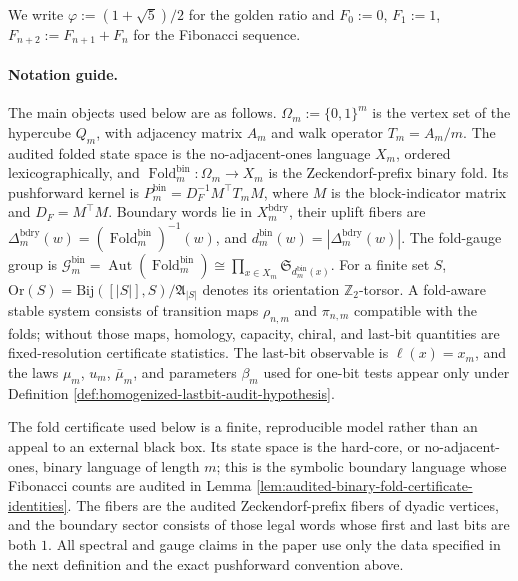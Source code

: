 \documentclass[12pt,a4paper]{article}
\theoremstyle{plain}
\theoremstyle{definition}
\numberwithin{equation}{section}
\DeclareMathOperator{\Aut}{Aut}
\newcommand{\ZZ}{\mathbb{Z}}
\newcommand{\Fold}{\operatorname{Fold}}
\begin{document}
We write \(\varphi:=(1+\sqrt5)/2\) for the golden ratio and \(F_0:=0\), \(F_1:=1\), \(F_{n+2}:=F_{n+1}+F_n\) for the Fibonacci sequence.

\paragraph{Notation guide.}
The main objects used below are as follows.  \(\Omega_m:=\{0,1\}^m\) is the vertex set of the hypercube \(Q_m\), with adjacency matrix \(A_m\) and walk operator \(T_m=A_m/m\).  The audited folded state space is the no-adjacent-ones language \(X_m\), ordered lexicographically, and \(\Fold_m^{\mathrm{bin}}:\Omega_m\to X_m\) is the Zeckendorf-prefix binary fold.  Its pushforward kernel is \(P_m^{\mathrm{bin}}=D_F^{-1}M^\top T_mM\), where \(M\) is the block-indicator matrix and \(D_F=M^\top M\).  Boundary words lie in \(X_m^{\mathrm{bdry}}\), their uplift fibers are \(\Delta_m^{\mathrm{bdry}}(w)=(\Fold_m^{\mathrm{bin}})^{-1}(w)\), and \(d_m^{\mathrm{bin}}(w)=|\Delta_m^{\mathrm{bdry}}(w)|\).  The fold-gauge group is \(\mathcal G_m^{\mathrm{bin}}=\Aut(\Fold_m^{\mathrm{bin}})\cong\prod_{x\in X_m}\mathfrak S_{d_m^{\mathrm{bin}}(x)}\).  For a finite set \(S\), \(\mathrm{Or}(S)=\mathrm{Bij}([|S|],S)/\mathfrak A_{|S|}\) denotes its orientation \(\ZZ_2\)-torsor.  A fold-aware stable system consists of transition maps \(\rho_{n,m}\) and \(\pi_{n,m}\) compatible with the folds; without those maps, homology, capacity, chiral, and last-bit quantities are fixed-resolution certificate statistics.  The last-bit observable is \(\ell(x)=x_m\), and the laws \(\mu_m\), \(u_m\), \(\bar\mu_m\), and parameters \(\beta_m\) used for one-bit tests appear only under Definition \ref{def:homogenized-lastbit-audit-hypothesis}.

The fold certificate used below is a finite, reproducible model rather than an appeal to an external black box.  Its state space is the hard-core, or no-adjacent-ones, binary language of length \(m\); this is the symbolic boundary language whose Fibonacci counts are audited in Lemma \ref{lem:audited-binary-fold-certificate-identities}.  The fibers are the audited Zeckendorf-prefix fibers of dyadic vertices, and the boundary sector consists of those legal words whose first and last bits are both \(1\).  All spectral and gauge claims in the paper use only the data specified in the next definition and the exact pushforward convention above.
\end{document}
